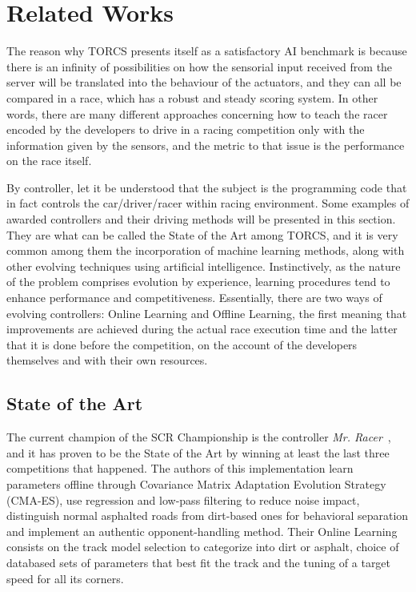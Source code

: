 \section{\textbf{Related Works}} \label{sec:relworks}
	
		The reason why TORCS presents itself as a satisfactory AI benchmark is because there is an infinity of
		possibilities on how the sensorial input received from the server will be translated into the behaviour of the
		actuators, and they can all be compared in a race, which has a robust and steady scoring system. In other
		words, there are many different approaches concerning how to teach the racer encoded by the developers to
		drive in a racing competition only with the information given by the sensors, and the metric to that issue
		is the performance on the race itself.
		
		By controller, let it be understood that the subject is the programming code that in fact controls the
		car/driver/racer within racing environment. Some examples of awarded controllers and their driving methods
		will be presented in this section. They are what can be called the State of the Art among TORCS, and it is
		very common among them the incorporation of machine learning methods, along with other evolving techniques
		using artificial intelligence. Instinctively, as the nature of the problem comprises evolution by experience,
		learning procedures tend to enhance performance and competitiveness. Essentially, there are two ways of
		evolving controllers: Online Learning and Offline Learning, the first meaning that improvements are achieved
		during the actual race execution time and the latter that it is done before the competition, on the account of
		the developers themselves and with their own resources.
		
\subsection{State of the Art}
		
		The current champion of the SCR Championship is the controller \emph{Mr. Racer}~\cite{MrRacer}, and it has
		proven to be the State of the Art by winning at least the last three competitions that happened. The authors
		of this implementation learn parameters offline through Covariance Matrix Adaptation Evolution Strategy
		(CMA-ES), use regression and low-pass filtering to reduce noise impact, distinguish normal asphalted roads
		from dirt-based ones for behavioral separation and implement an authentic opponent-handling method. Their
		Online Learning consists on the track model selection to categorize into dirt or asphalt, choice of databased
		sets of parameters that best fit the track and the tuning of a target speed for all its corners.
		
